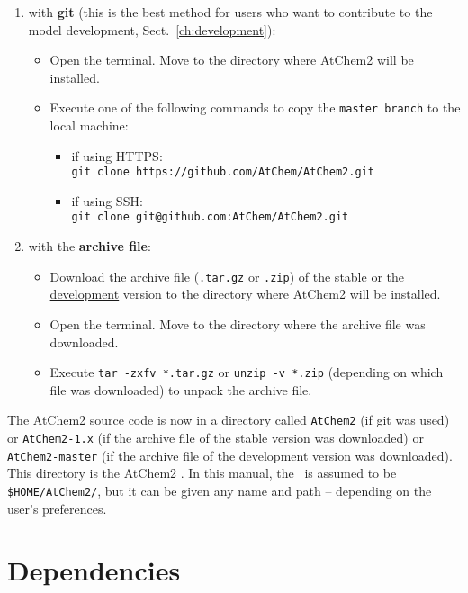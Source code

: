 \begin{enumerate}
\item with \textbf{git} (this is the best method for users who want to
  contribute to the model development, Sect.~\ref{ch:development}):
  \begin{itemize}
  \item Open the terminal. Move to the directory where AtChem2 will be
    installed.
  \item Execute one of the following commands to copy the
    \texttt{master\ branch} to the local machine:
    \begin{itemize}
      \item if using HTTPS:\\
        \verb|git clone https://github.com/AtChem/AtChem2.git|
      \item if using SSH:\\
        \verb|git clone git@github.com:AtChem/AtChem2.git|
    \end{itemize}
  \end{itemize}
\item with the \textbf{archive file}:
  \begin{itemize}
  \item Download the archive file (\texttt{.tar.gz} or \texttt{.zip}) of
    the \href{https://github.com/AtChem/AtChem2/releases}{stable} or the
    \href{https://github.com/AtChem/AtChem2/archive/master.zip}{development}
    version to the directory where AtChem2 will be installed.
  \item Open the terminal. Move to the directory where the archive
    file was downloaded.
  \item Execute \verb|tar -zxfv *.tar.gz| or \verb|unzip -v *.zip|
    (depending on which file was downloaded) to unpack the archive
    file.
  \end{itemize}
\end{enumerate}

The AtChem2 source code is now in a directory called \texttt{AtChem2}
(if git was used) or \texttt{AtChem2-1.x} (if the archive file of the
stable version was downloaded) or \texttt{AtChem2-master} (if the
archive file of the development version was downloaded). This
directory is the AtChem2 \maindir. In this manual, the \maindir\ is
assumed to be \texttt{\$HOME/AtChem2/}, but it can be given any name
and path -- depending on the user's preferences.

\section{Dependencies} \label{sec:dependencies}

